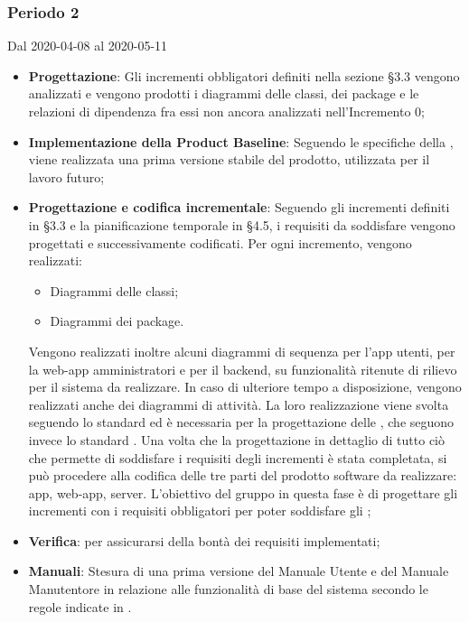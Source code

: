 \subsubsection{Periodo 2} 
Dal 2020-04-08 al 2020-05-11
\begin{itemize}
	\item \textbf{Progettazione}: Gli incrementi obbligatori definiti nella sezione §3.3 vengono analizzati e vengono prodotti i diagrammi delle classi, dei package e le relazioni di dipendenza fra essi non ancora analizzati nell'Incremento 0;
	\item \textbf{Implementazione della Product Baseline}: Seguendo le specifiche della , viene realizzata una prima versione stabile del prodotto,  utilizzata per il lavoro futuro;
	\item \textbf{Progettazione e codifica incrementale}: Seguendo gli incrementi definiti in §3.3 e la pianificazione temporale in §4.5, i requisiti da soddisfare vengono progettati e successivamente codificati. Per ogni incremento, vengono realizzati:
	\begin{itemize}
		\item Diagrammi delle classi;
		\item Diagrammi dei package.
	\end{itemize}
	Vengono realizzati inoltre alcuni diagrammi di sequenza per l'app utenti, per la web-app amministratori e per il backend, su funzionalità ritenute di rilievo per il sistema da realizzare. In caso di ulteriore tempo a disposizione, vengono realizzati anche dei diagrammi di attività.
	La loro realizzazione viene svolta seguendo lo standard  ed è necessaria per la progettazione delle , che seguono invece lo standard .
	Una volta che la progettazione in dettaglio di tutto ciò che permette di soddisfare i requisiti degli incrementi è stata completata, si può procedere alla codifica delle tre parti del prodotto software da realizzare: app, web-app, server.
	L'obiettivo del gruppo in questa fase è di progettare gli incrementi con i requisiti obbligatori per poter soddisfare gli ;
	\item \textbf{Verifica}:  per assicurarsi della bontà dei requisiti implementati;
	\item \textbf{Manuali}: Stesura di una prima versione del Manuale Utente e del Manuale Manutentore in relazione alle funzionalità di base del sistema secondo le regole indicate in \NdP{}.
\end{itemize}

